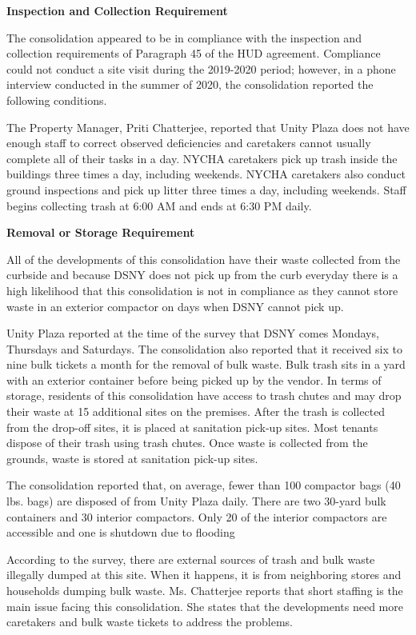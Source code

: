 

\textbf{Inspection and Collection Requirement}

The consolidation appeared to be in compliance with the inspection and collection requirements of Paragraph 45 of the HUD agreement. Compliance could not conduct a site visit during the 2019-2020 period; however, in a phone interview conducted in the summer of 2020, the consolidation reported the following conditions.

The Property Manager, Priti Chatterjee, reported that Unity Plaza does not have enough staff to correct observed deficiencies and caretakers cannot usually complete all of their tasks in a day. NYCHA caretakers pick up trash inside the buildings three times a day, including weekends. NYCHA caretakers also conduct ground inspections and pick up litter three times a day, including weekends. Staff begins collecting trash at 6:00 AM and ends at 6:30 PM daily. 

\textbf{Removal or Storage Requirement}

All of the developments of this consolidation have their waste collected from the curbside and because DSNY does not pick up from the curb everyday there is a high likelihood that this consolidation is not in compliance as they cannot store waste in an exterior compactor on days when DSNY cannot pick up.

Unity Plaza reported at the time of the survey that DSNY comes Mondays, Thursdays and Saturdays. The consolidation also reported that it received six to nine bulk tickets a month for the removal of bulk waste. Bulk trash sits in a yard with an exterior container before being picked up by the vendor. In terms of storage, residents of this consolidation have access to trash chutes and may drop their waste at 15 additional sites on the premises. After the trash is collected from the drop-off sites, it is placed at sanitation pick-up sites. Most tenants dispose of their trash using trash chutes. Once waste is collected from the grounds, waste is stored at sanitation pick-up sites.

The consolidation reported that, on average, fewer than 100 compactor bags (40 lbs. bags) are disposed of from Unity Plaza daily. There are two 30-yard bulk containers and 30 interior compactors. Only 20 of the interior compactors are accessible and one is shutdown due to flooding

According to the survey, there are external sources of trash and bulk waste illegally dumped at this site. When it happens, it is from neighboring stores and households dumping bulk waste. Ms. Chatterjee reports that short staffing is the main issue facing this consolidation. She states that the developments need more caretakers and bulk waste tickets to address the problems.